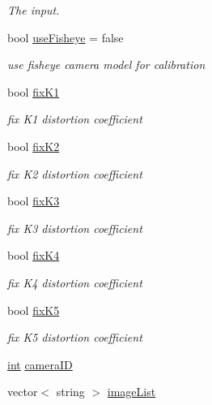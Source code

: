 \begin{DoxyCompactItemize}
\begin{DoxyCompactList}\small\item\em The input. \end{DoxyCompactList}\item 
bool \mbox{\hyperlink{class_cal_settings_a5bd22c0af6208eb2733625a23e209b94}{use\+Fisheye}} = false
\begin{DoxyCompactList}\small\item\em use fisheye camera model for calibration \end{DoxyCompactList}\item 
bool \mbox{\hyperlink{class_cal_settings_a062c6f2dcf6356c1260a7dfbfae4488a}{fix\+K1}}
\begin{DoxyCompactList}\small\item\em fix K1 distortion coefficient \end{DoxyCompactList}\item 
bool \mbox{\hyperlink{class_cal_settings_af4cc9513c1717b53bf7112197e185784}{fix\+K2}}
\begin{DoxyCompactList}\small\item\em fix K2 distortion coefficient \end{DoxyCompactList}\item 
bool \mbox{\hyperlink{class_cal_settings_ad5b43b38acd876e10dda7525c235034e}{fix\+K3}}
\begin{DoxyCompactList}\small\item\em fix K3 distortion coefficient \end{DoxyCompactList}\item 
bool \mbox{\hyperlink{class_cal_settings_a0d0848f0958b4cdaed7a3f2e32a1496e}{fix\+K4}}
\begin{DoxyCompactList}\small\item\em fix K4 distortion coefficient \end{DoxyCompactList}\item 
bool \mbox{\hyperlink{class_cal_settings_a2f22ee23f05778e7a44e2f8b15c1298d}{fix\+K5}}
\begin{DoxyCompactList}\small\item\em fix K5 distortion coefficient \end{DoxyCompactList}\item 
\mbox{\hyperlink{draw_8hh_aa620a13339ac3a1177c86edc549fda9b}{int}} \mbox{\hyperlink{class_cal_settings_a94ef868bedd92ddce22dfebc25df9d1f}{camera\+ID}}
\item 
vector$<$ string $>$ \mbox{\hyperlink{class_cal_settings_a93efb0e90500e865060c8ed64ca19c7e}{image\+List}}

\end{DoxyCompactItemize}
